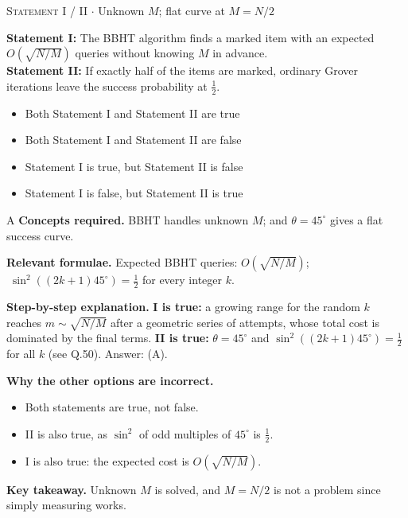 \documentclass[11pt,a4paper]{article}
\newcommand{\optlabel}[1]{\textbf{(#1)}}
\newcommand{\correctlabel}[1]{\textcolor{okgreen}{\textbf{(#1)}\,\ding{51}}}
\newenvironment{qitem}[1]{\begin{list}{}{\setlength{\leftmargin}{3.3em}\setlength{\labelwidth}{3.1em}%
  \setlength{\labelsep}{0.2em}\setlength{\topsep}{3pt}\setlength{\parsep}{3pt}}\item[\textbf{Q.#1}\hfill]}{\end{list}}
\newcommand{\qsep}{\par\vspace{2pt}{\color{black!15}\hrule}\vspace{4pt}}
\newcommand{\qmeta}[2]{{\footnotesize\color{black!60}\textsc{#1} \;$\cdot$\; #2}\par}
\begin{document}
\begin{qitem}{78}
\qmeta{Statement I / II}{Unknown $M$; flat curve at $M = N/2$}
\textbf{Statement I:} The BBHT algorithm finds a marked item with an expected $O(\sqrt{N/M})$ queries without knowing $M$ in advance.\\[1mm]
\textbf{Statement II:} If exactly half of the items are marked, ordinary Grover iterations leave the success probability at $\frac12$.
\begin{itemize}[leftmargin=2.6em, labelsep=0.4em, itemsep=2pt, topsep=3pt]
\item[\correctlabel{A}] Both Statement I and Statement II are true
\item[\optlabel{B}] Both Statement I and Statement II are false
\item[\optlabel{C}] Statement I is true, but Statement II is false
\item[\optlabel{D}] Statement I is false, but Statement II is true
\end{itemize}
\end{qitem}
\begin{solbox}{A}
\textbf{\color{brand}Concepts required.} BBHT handles unknown $M$; and $\theta = 45^\circ$ gives a flat success curve.

\textbf{\color{brand}Relevant formulae.} Expected BBHT queries: $O(\sqrt{N/M})$; $\;\sin^2((2k+1)45^\circ) = \frac12$ for every integer $k$.

\textbf{\color{brand}Step-by-step explanation.} \textbf{I is true:} a growing range for the random $k$ reaches $m \sim \sqrt{N/M}$ after a geometric series of attempts, whose total cost is dominated by the final terms.
\textbf{II is true:} $\theta = 45^\circ$ and $\sin^2((2k+1)45^\circ) = \frac12$ for all $k$ (see Q.50). Answer: (A).

\textbf{\color{brand}Why the other options are incorrect.}
\begin{itemize}[leftmargin=2.4em, itemsep=1pt, topsep=2pt]
\item[\textbf{(B)}] Both statements are true, not false.
\item[\textbf{(C)}] II is also true, as $\sin^2$ of odd multiples of $45^\circ$ is $\frac12$.
\item[\textbf{(D)}] I is also true: the expected cost is $O(\sqrt{N/M})$.
\end{itemize}
\textbf{\color{brand}Key takeaway.} Unknown $M$ is solved, and $M = N/2$ is not a problem since simply measuring works.
\end{solbox}
\qsep
\end{document}
